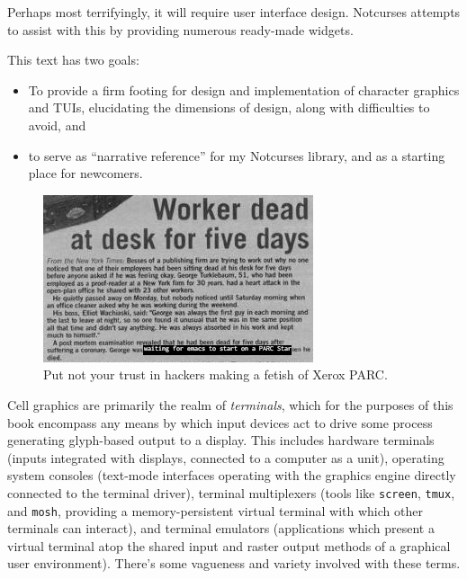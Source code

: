 \documentclass[letterpaper,10pt]{article}
\newenvironment{denseitemize}{
  \begin{itemize}
      \setlength{\itemsep}{0pt}
}{
  \end{itemize}
}
\begin{document}
Perhaps most terrifyingly, it will require user interface design. Notcurses
attempts to assist with this by providing numerous ready-made widgets.

This text has two goals:
\begin{denseitemize}
\item{To provide a firm footing for design and implementation of character
    graphics and TUIs, elucidating the dimensions of design, along with difficulties
    to avoid, and}
\item{to serve as ``narrative reference''\cite{newjournalism} for my Notcurses
      library, and as a starting place for newcomers.}
\end{denseitemize}

\begin{figure}[!htb]
\centering \includegraphics[width=.5\linewidth]{media/emacs-xerox.jpg}
  \caption{Put not your trust in hackers making a fetish of Xerox PARC.}
  \label{fig:xeroxemacs}
\end{figure}

Cell graphics are primarily the realm of \textit{terminals}, which for the
purposes of this book encompass any means by which input devices act to drive
some process generating glyph-based output to a display. This includes hardware
terminals (inputs integrated with displays, connected to a computer as a unit),
operating system consoles (text-mode interfaces operating with the graphics
engine directly connected to the terminal driver), terminal multiplexers (tools
like \texttt{screen}, \texttt{tmux}, and \texttt{mosh}, providing a
memory-persistent virtual terminal with which other terminals can interact),
and terminal emulators (applications which present a virtual terminal atop the
shared input and raster output methods of a graphical user environment).
There's some vagueness and variety involved with these terms.
\end{document}

